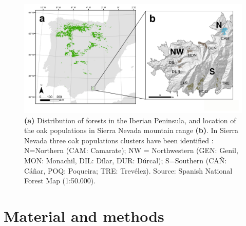 \begin{figure}
    \centering
    \includegraphics[width=\textwidth]{img/es/es-mapa_spain_sn.jpg}
    \caption{\textbf{(a)} Distribution of \Qpy forests in the Iberian Peninsula, and location of the oak populations in Sierra Nevada mountain range \textbf{(b)}. In Sierra Nevada three oak populations clusters have been identified \autocite{PerezLuqueetal2021EcologicalDiversity}: N=Northern (CAM: Camarate); NW = Northwestern (GEN: Genil, MON: Monachil, DIL: Dílar, DUR: Dúrcal); S=Southern (CAÑ: Cáñar, POQ: Poqueira; TRE: Trevélez). Source: Spanish National Forest Map (1:50.000).}\label{fig:es:location}
\end{figure}

\section{Material and methods}\label{sec:es:mat}
